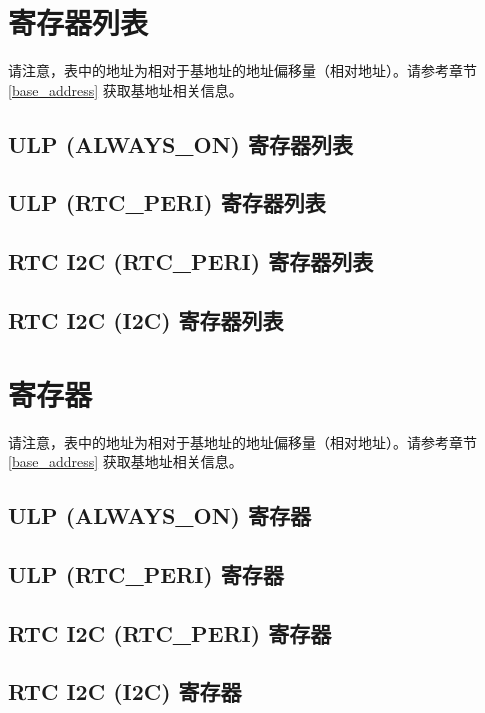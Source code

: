 \documentclass[main\_\_CN.tex]{subfiles}
\begin{document}
\hypertarget{ulp-reg-summ}{}
\section{寄存器列表}
\label{ulp-reg-summ}


请注意，表中的地址为相对于基地址的地址偏移量（相对地址）。请参考章节 \ref{base_address} 获取基地址相关信息。

\subsection{ULP (ALWAYS\_ON) 寄存器列表}


\subsection{ULP (RTC\_PERI) 寄存器列表}


\subsection{RTC I2C (RTC\_PERI) 寄存器列表}


\subsection{RTC I2C (I2C) 寄存器列表}


\section{寄存器}

请注意，表中的地址为相对于基地址的地址偏移量（相对地址）。请参考章节 \ref{base_address} 获取基地址相关信息。

\subsection{ULP (ALWAYS\_ON) 寄存器}


\subsection{ULP (RTC\_PERI) 寄存器}


\subsection{RTC I2C (RTC\_PERI) 寄存器}


\subsection{RTC I2C (I2C) 寄存器}

\end{document}
